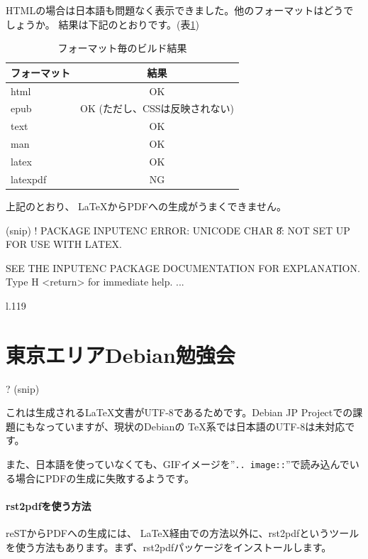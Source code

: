 \documentclass[mingoth,a4paper]{jsarticle}
\begin{document}
HTMLの場合は日本語も問題なく表示できました。他のフォーマットはどうでしょうか。
結果は下記のとおりです。(表\ref{tab:format})

\begin{table}[h]
 \caption{フォーマット毎のビルド結果}\label{tab:format}
 \begin{center}
{\scriptsize
  \begin{tabular}{|l|c|}
    \hline
    フォーマット & 結果 \\
    \hline
    html & OK \\
    epub & OK (ただし、CSSは反映されない)\\
    text & OK \\
    man & OK \\
    latex & OK \\
    latexpdf & NG \\
    \hline
  \end{tabular}
}
 \end{center}
\end{table}

上記のとおり、 \LaTeX からPDFへの生成がうまくできません。

\begin{commandline}
(snip)
! PACKAGE INPUTENC ERROR: UNICODE CHAR \U8: NOT SET UP FOR USE WITH LATEX.

SEE THE INPUTENC PACKAGE DOCUMENTATION FOR EXPLANATION.
Type  H <return>  for immediate help.
 ...

l.119 \chapter{東京エリアDebian勉強会}

?
(snip)
\end{commandline}

これは生成される\LaTeX 文書がUTF-8であるためです。Debian JP Projectでの課題にもなっていますが、現状のDebianの \TeX 系では日本語のUTF-8は未対応です。

また、日本語を使っていなくても、GIFイメージを''\texttt{.. image::}''で読み込んでいる場合にPDFの生成に失敗するようです。

\subsubsection{rst2pdfを使う方法}
reSTからPDFへの生成には、 \LaTeX 経由での方法以外に、rst2pdfというツールを使う方法もあります。まず、rst2pdfパッケージをインストールします。

\end{document}
